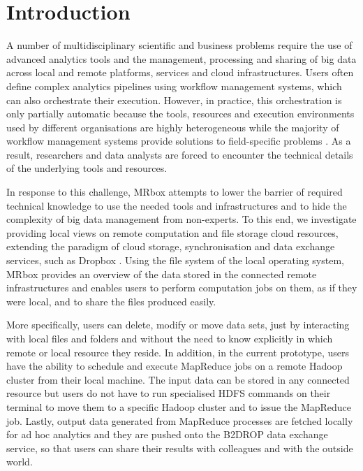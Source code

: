 \section{Introduction}
A number of multidisciplinary scientific and business problems require the use of advanced analytics tools and the management, processing and sharing of big data across local and remote platforms, services and cloud infrastructures. Users often define complex analytics pipelines using workflow management systems, which can also orchestrate their execution. However, in practice, this orchestration is only partially automatic because the tools, resources and execution environments used by different organisations are highly heterogeneous while the majority of workflow management systems provide solutions to field-specific problems \cite{khan2019big}. As a result, researchers and data analysts are forced to encounter the technical details of the underlying tools and resources.

In response to this challenge, MRbox attempts to lower the barrier of required technical knowledge to use the needed tools and infrastructures and to hide the complexity of big data management from non-experts. To this end, we investigate providing local views on remote computation and file storage cloud resources, extending the paradigm of cloud storage, synchronisation and data exchange services, such as Dropbox \cite{dropbox}. Using the file system of the local operating system, MRbox provides an overview of the data stored in the connected remote infrastructures and enables users to perform computation jobs on them, as if they were local, and to share the files produced easily. 

More specifically, users can delete, modify or move data sets, just by interacting with local files and folders and without the need to know explicitly in which remote or local resource they reside. In addition, in the current prototype, users have the ability to schedule and execute MapReduce jobs \cite{dean2008mapreduce} on a remote Hadoop cluster \cite{shvachko2010hadoop} from their local machine. The input data can be stored in any connected resource but users do not have to run specialised HDFS commands \cite{shvachko2010hadoop} on their terminal to move them to a specific Hadoop cluster and to issue the MapReduce job. Lastly, output data generated from MapReduce processes are fetched locally for ad hoc analytics and they are pushed onto the B2DROP data exchange service\cite{b2drop}, so that users can share their results with colleagues and with the outside world. 


